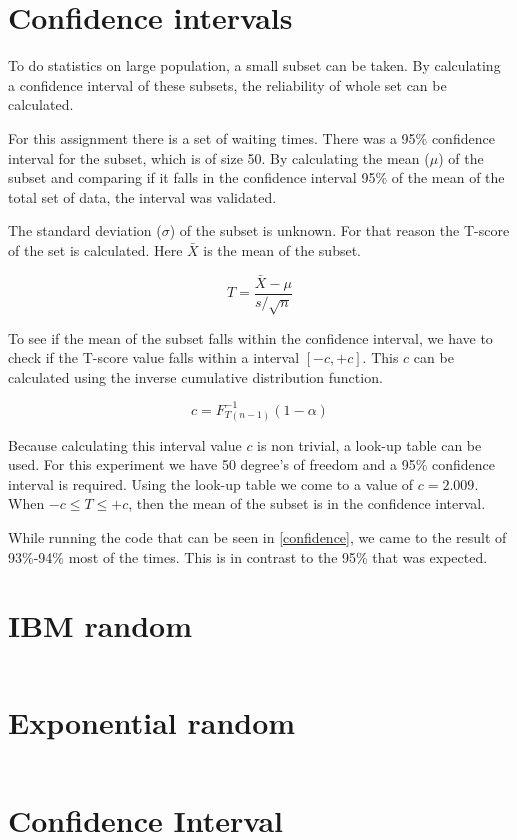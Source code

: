 \documentclass[a4paper,12px]{article}
\begin{document}
\section{Confidence intervals}

To do statistics on large population, a small subset can be taken. By
calculating a confidence interval of these subsets, the reliability of whole set
can be calculated.

For this assignment there is a set of waiting times. There was a 95\% confidence
interval for the subset, which is of size 50. By calculating the mean ($\mu$) of the
subset and comparing if it falls in the confidence interval 95\% of the mean of
the total set of data, the interval was validated.

The standard deviation ($\sigma$) of the subset is unknown. For that reason the
T-score of the set is calculated. Here $\bar{X}$ is the mean of the subset.

$$ T = \frac{\bar{X} - \mu}{s / \sqrt{n}} $$

To see if the mean of the subset falls within the confidence interval, we have
to check if the T-score value falls within a interval $[-c, +c]$. This $c$ can
be calculated using the inverse cumulative distribution function.

$$ c = F^{-1}_{T(n-1)} (1-\alpha) $$

Because calculating this interval value $c$ is non trivial, a look-up table can
be used. For this experiment we have 50 degree's of freedom and a 95\%
confidence interval is required. Using the look-up table we come to a value of
$c = 2.009$. When $-c \leq T \leq +c$, then the mean of the subset is in the
confidence interval.

While running the code that can be seen in \autoref{confidence}, we came to the
result of 93\%-94\% most of the times. This is in contrast to the 95\% that was
expected.

\appendix
\section{IBM random}
\label{o22}
{\footnotesize\inputminted{python}{o22.py}}

\section{Exponential random}
\label{o3}
{\footnotesize\inputminted{python}{o3.py}}

\section{Confidence Interval}
\label{confidence}
{\footnotesize\inputminted{python}{confidence.py}}


% 
% 
\end{document}
